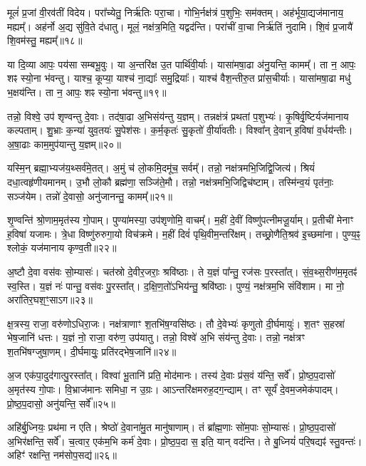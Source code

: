 मूलं॑ प्र॒जां वी॒रव॑तीं विदेय। परा᳚च्येतु॒ निर्\mbox{}ऋ॑तिः परा॒चा। गोभि॒र्नक्ष॑त्रं प॒शुभिः॒ सम॑क्तम्। अह॑र्भूया॒द्यज॑मानाय॒ मह्यम्᳚। अह॑र्नो अ॒द्य सु॑वि॒ते द॑धातु। मूलं॒ नक्ष॑त्र॒मिति॒ यद्वद॑न्ति। परा॑चीं वा॒चा निर्\mbox{}ऋ॑तिं नुदामि। शि॒वं प्र॒जायै॑ शि॒वम॑स्तु॒ मह्यम्᳚॥१८॥ 

या दि॒व्या आपः॒ पय॑सा सम्बभू॒वुः। या अ॒न्तरि॑क्ष उ॒त पार्थि॑वी॒र्याः। यासा॑मषा॒ढा अ॑नु॒यन्ति॒ कामम्᳚। ता न॒ आपः॒ शꣴ स्यो॒ना भ॑वन्तु। याश्च॒ कूप्या॒ याश्च॑ ना॒द्याः᳚ समु॒द्रियाः᳚। याश्च॑ वैश॒न्तीरु॒त प्रा॑स॒चीर्याः। यासा॑मषा॒ढा मधु॑ भ॒क्षय॑न्ति। ता न॒ आपः॒ शꣴ स्यो॒ना भ॑वन्तु॥१९॥ 

तन्नो॒ विश्वे॒ उप॑ शृण्वन्तु दे॒वाः। तद॑षा॒ढा अ॒भिसंय॑न्तु य॒ज्ञम्। तन्नक्ष॑त्रं प्रथतां प॒शुभ्यः॑। कृ॒षिर्वृ॒ष्टिर्यज॑मानाय कल्पताम्। शु॒भ्राः क॒न्या॑ युव॒तयः॑ सु॒पेश॑सः। क॒र्म॒कृतः॑ सु॒कृतो॑ वी॒र्या॑वतीः। विश्वा᳚न् दे॒वान् ह॒विषा॑ व॒र्धय॑न्तीः। अ॒षा॒ढाः काम॒मुप॑यान्तु य॒ज्ञम्॥२०॥ 

यस्मि॒न् ब्रह्मा॒भ्यज॑य॒थ्सर्व॑मे॒तत्। अ॒मुं च॑ लो॒कमि॒दमू॑च॒ सर्वम्᳚। तन्नो॒ नक्ष॑त्रमभि॒जिद्वि॒जित्य॑। श्रियं॑ दधा॒त्वहृ॑णीय\-मानम्। उ॒भौ लो॒कौ ब्रह्म॑णा॒ सञ्जि॑ते॒मौ। तन्नो॒ नक्ष॑त्रमभि॒जिद्विच॑ष्टाम्। तस्मि॑न्व॒यं पृत॑नाः॒ सञ्ज॑येम। तन्नो॑ दे॒वासो॒ अनु॑जानन्तु॒ कामम्᳚॥२१॥ 

शृ॒ण्वन्ति॑ श्रो॒णाम॒मृत॑स्य गो॒पाम्। पुण्या॑मस्या॒ उप॑शृणोमि॒ वाचम्᳚। म॒हीं दे॒वीं विष्णु॑पत्नीमजू॒र्याम्। प्र॒तीची॑ मेनाꣳ ह॒विषा॑ यजामः। त्रे॒धा विष्णु॑रुरुगा॒यो विच॑क्रमे। म॒हीं दिवं॑ पृथि॒वीम॒न्तरि॑क्षम्। तच्छ्रो॒णैति॒श्रव॑ इ॒च्छमा॑ना। पुण्य॒ꣴ॒ श्लोकं॒ यज॑मानाय कृण्व॒ती॥२२॥ 

अ॒ष्टौ दे॒वा वस॑वः सो॒म्यासः॑। चत॑स्रो दे॒वीर॒जराः॒ श्रवि॑ष्ठाः। ते य॒ज्ञं पा᳚न्तु॒ रज॑सः प॒रस्ता᳚त्। सं॒व॒थ्स॒रीण॑म॒मृतꣴ॑ स्व॒स्ति। य॒ज्ञं नः॑ पान्तु॒ वस॑वः पु॒रस्ता᳚त्। द॒क्षि॒ण॒तो॑ऽभिय॑न्तु॒ श्रवि॑ष्ठाः। पुण्यं॒ नक्ष॑त्रम॒भि संवि॑शाम। मा नो॒ अरा॑तिर॒घश॒ꣳ॒साऽग\snn{}॥२३॥ 

क्ष॒त्रस्य॒ राजा॒ वरु॑णोऽधिरा॒जः। नक्ष॑त्राणाꣳ श॒तभि॑ष॒ग्वसि॑ष्ठः। तौ दे॒वेभ्यः॑ कृणुतो दी॒र्घमायुः॑। श॒तꣳ स॒हस्रा॑ भेष॒जानि॑ धत्तः। य॒ज्ञं नो॒ राजा॒ वरु॑ण॒ उप॑यातु। तन्नो॒ विश्वे॑ अ॒भि संय॑न्तु दे॒वाः। तन्नो॒ नक्ष॑त्रꣳ श॒तभि॑षग्जुषा॒णम्। दी॒र्घमायुः॒ प्रति॑रद्भेष॒जानि॑॥२४॥ 

अ॒ज एक॑पा॒दुद॑गात्पु॒रस्ता᳚त्। विश्वा॑ भू॒तानि॑ प्रति॒ मोद॑मानः। तस्य॑ दे॒वाः प्र॑स॒वं य॑न्ति॒ सर्वे᳚। प्रो॒ष्ठ॒प॒दासो॑ अ॒मृत॑स्य गो॒पाः। वि॒भ्राज॑मानः समिधा॒ न उ॒ग्रः। आऽन्तरि॑क्षमरुह॒दग॒न्द्याम्। तꣳ सूर्यं॑ दे॒वम॒जमेक॑पादम्। प्रो॒ष्ठ॒प॒दासो॒ अनु॑यन्ति॒ सर्वे᳚॥२५॥ 

अहि॑र्बु॒ध्नियः॒ प्रथ॑मा न एति। श्रेष्ठो॑ दे॒वाना॑मु॒त मानु॑षाणाम्। तं ब्रा᳚ह्म॒णाः सो॑म॒पाः सो॒म्यासः॑। प्रो॒ष्ठ॒प॒दासो॑ अ॒भिर॑क्षन्ति॒ सर्वे᳚। च॒त्वार॒ एक॑म॒भि कर्म॑ दे॒वाः। प्रो॒ष्ठ॒प॒दा स॒ इति॒ यान् वद॑न्ति। ते बु॒ध्नियं॑ परि॒षद्यꣴ॑ स्तु॒वन्तः॑। अहिꣳ॑ रक्षन्ति॒ नम॑सोप॒सद्य॑॥२६॥ 

